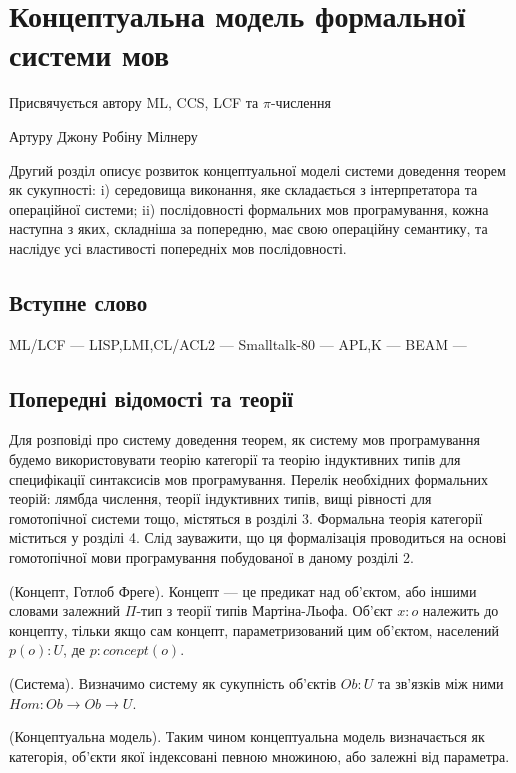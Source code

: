 
\chapter{Концептуальна модель формальної системи мов}
\epigraph{Присвячується автору ML, CCS, LCF та $\pi$-числення}{Артуру Джону Робіну Мілнеру}

Другий розділ описує розвиток концептуальної моделі системи доведення теорем як сукупності:
i) середовища виконання, яке складається з інтерпретатора та операційної системи;
ii) послідовності формальних мов програмування,
кожна наступна з яких, складніша за попередню,
має свою операційну семантику, та наслідує усі властивості
попередніх мов послідовності.

\section*{Вступне слово}
ML/LCF ---
LISP,LMI,CL/ACL2 ---
Smalltalk-80 ---
APL,K ---
BEAM ---

\section{Попередні відомості та теорії}
Для розповіді про систему доведення теорем, як систему мов програмування
будемо використовувати теорію категорії та теорію індуктивних
типів для специфікації синтаксисів мов програмування. Перелік необхідних формальних теорій:
лямбда числення, теорії індуктивних типів, вищі рівності для гомотопічної системи
тощо, містяться в розділі 3. Формальна теорія категорії міститься у розділі 4.
Слід зауважити, що ця формалізація проводиться на основі гомотопічної
мови програмування побудованої в даному розділі 2.

\begin{definition} (Концепт, Готлоб Фреге).
Концепт --- це предикат над об'єктом,
або іншими словами залежний $\Pi$-тип з теорії типів Мартіна-Льофа.
Об'єкт $x : o$ належить до концепту, тільки якщо сам концепт,
параметризований цим об'єктом, населений $p(o) : U$, де $p : concept(o)$.
\end{definition}

\begin{definition} (Система).
Визначимо систему як сукупність об'єктів $Ob : U$
та зв'язків між ними $Hom : Ob \rightarrow Ob \rightarrow U$.
\end{definition}

\begin{definition} (Концептуальна модель).
Таким чином концептуальна модель визначається як категорія, об'єкти якої
індексовані певною множиною, або залежні від параметра.
\end{definition}

